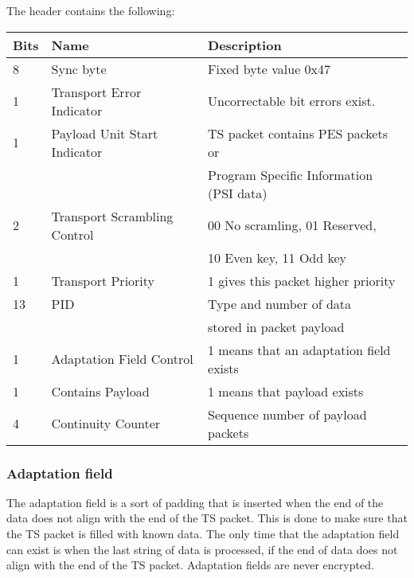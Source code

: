 The header contains the following:
\begin{longtable}{| l | l | l |}
  \hline
  Bits & Name & Description \\ \hline
  8 & Sync byte & Fixed byte value 0x47 \\ \hline
  1 & Transport Error Indicator & Uncorrectable bit errors exist. \\ 
  \hline
  1 & Payload Unit Start Indicator & TS packet contains PES packets or\\
  & & Program Specific Information (PSI data)\\ \hline
  2 & Transport Scrambling Control & 00 No scramling, 01 Reserved, \\
  & & 10 Even key, 11 Odd key \\ \hline
  1 & Transport Priority & 1 gives this packet higher priority \\ \hline
  13 & PID & Type and number of data \\
  & & stored in packet payload \\ \hline
  1 & Adaptation Field Control & 1 means that an adaptation field 
  exists\\ \hline
  1 & Contains Payload & 1 means that payload exists \\ \hline
  4 & Continuity Counter & Sequence number of payload packets\\ \hline
\end{longtable}

\subsubsection{Adaptation field}
The adaptation field is a sort of padding that is inserted when the 
end of the data does not align with the end of the TS packet. This is 
done to make sure that the TS packet is filled with known data. The 
only time that the adaptation field can exist is when the last string 
of data is processed, if the end of data does not align with the end 
of the TS packet. Adaptation fields are never encrypted. 
\cite[pp. 10--11]{DVB:2013}

